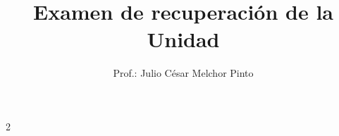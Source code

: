 \documentclass[12pt,addpoints]{evalua}
\title{Examen de {\color{brown}recuperación} de la Unidad}
\author{Prof.: Julio César Melchor Pinto}
\begin{document}
%
\begin{multicols}{2}
      
      
      
      
\end{multicols}
\begin{questions}








\end{questions}
\end{document}
